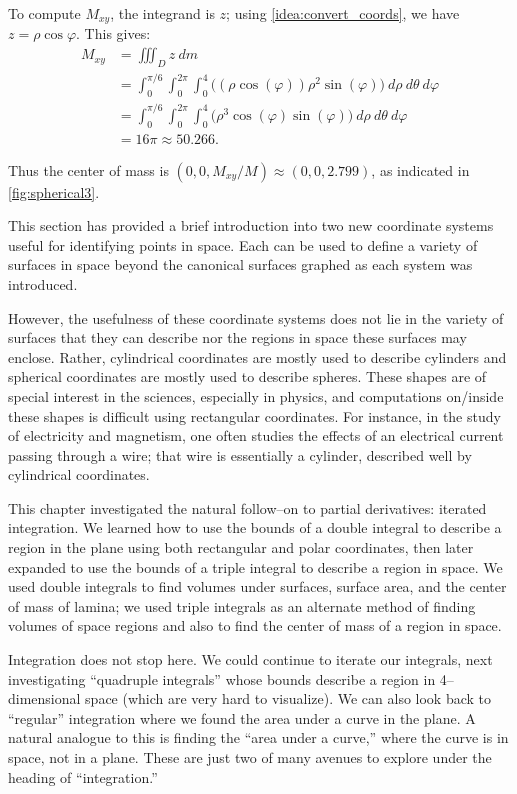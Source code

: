 {To compute $M_{xy}$, the integrand is $z$; using \autoref{idea:convert_coords}, we have $z = \rho\cos\varphi$. This gives:
\begin{align*}
M_{xy} &= \iiint_D z\ dm \\
	&= \int_0^{\pi/6}\int_0^{2\pi}\int_0^4 \big((\rho\cos(\varphi))\rho^2\sin(\varphi)\big) \ d\rho\ d\theta\ d\varphi\\
	&= \int_0^{\pi/6}\int_0^{2\pi}\int_0^4 \big(\rho^3\cos(\varphi)\sin(\varphi)\big) \ d\rho\ d\theta\ d\varphi\\
	&=16\pi \approx 50.266.
\end{align*}

Thus the center of mass is $(0,0,M_{xy}/M) \approx (0,0,2.799)$, as indicated in \autoref{fig:spherical3}.}

This section has provided a brief introduction into two new coordinate systems useful for identifying points in space. Each can be used to define a variety of surfaces in space beyond the canonical surfaces graphed as each system was introduced.

However, the usefulness of these coordinate systems does not lie in the variety of surfaces that they can describe nor the regions in space these surfaces may enclose. Rather,  cylindrical coordinates are mostly used to describe cylinders and spherical coordinates are mostly used to describe spheres. These shapes are of special interest in the sciences, especially in physics, and computations on/inside these shapes is difficult using rectangular coordinates. For instance, in the study of electricity and magnetism, one often studies the effects of an electrical current passing through a wire; that wire is essentially a cylinder, described well by cylindrical coordinates.\bigskip

This chapter investigated the natural follow--on to partial derivatives: iterated integration. We learned how to use the bounds of a double integral to describe a region in the plane using both rectangular and polar coordinates, then later expanded to use the bounds of a triple integral to describe a region in space. We used double integrals to find volumes under surfaces, surface area, and the center of mass of lamina; we used triple integrals as an alternate method of finding volumes of space regions and also to find the center of mass of a region in space.

Integration does not stop here. We could continue to iterate our integrals, next investigating ``quadruple integrals'' whose bounds describe a region in 4--dimensional space (which are very hard to visualize). We can also look back to ``regular'' integration where we found the area under a curve in the plane. A natural analogue to this is finding the ``area under a curve,'' where the curve is in space, not in a plane. These are just two of many avenues to explore under the heading of ``integration.''

